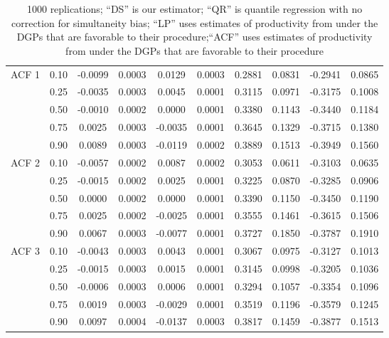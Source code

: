 \documentclass[11pt]{article}
\begin{document}
\begin{table}[H]
\begin{tabular}{cccccccccc}
   \hline
ACF 1 & 0.10 & -0.0099 & 0.0003 & 0.0129 & 0.0003 & 0.2881 & 0.0831 & -0.2941 & 0.0865 \\ 
   & 0.25 & -0.0035 & 0.0003 & 0.0045 & 0.0001 & 0.3115 & 0.0971 & -0.3175 & 0.1008 \\ 
   & 0.50 & -0.0010 & 0.0002 & 0.0000 & 0.0001 & 0.3380 & 0.1143 & -0.3440 & 0.1184 \\ 
   & 0.75 & 0.0025 & 0.0003 & -0.0035 & 0.0001 & 0.3645 & 0.1329 & -0.3715 & 0.1380 \\ 
   & 0.90 & 0.0089 & 0.0003 & -0.0119 & 0.0002 & 0.3889 & 0.1513 & -0.3949 & 0.1560 \\ 
  ACF 2 & 0.10 & -0.0057 & 0.0002 & 0.0087 & 0.0002 & 0.3053 & 0.0611 & -0.3103 & 0.0635 \\ 
   & 0.25 & -0.0015 & 0.0002 & 0.0025 & 0.0001 & 0.3225 & 0.0870 & -0.3285 & 0.0906 \\ 
   & 0.50 & 0.0000 & 0.0002 & 0.0000 & 0.0001 & 0.3390 & 0.1150 & -0.3450 & 0.1190 \\ 
   & 0.75 & 0.0025 & 0.0002 & -0.0025 & 0.0001 & 0.3555 & 0.1461 & -0.3615 & 0.1506 \\ 
   & 0.90 & 0.0067 & 0.0003 & -0.0077 & 0.0001 & 0.3727 & 0.1850 & -0.3787 & 0.1910 \\ 
  ACF 3 & 0.10 & -0.0043 & 0.0003 & 0.0043 & 0.0001 & 0.3067 & 0.0975 & -0.3127 & 0.1013 \\ 
   & 0.25 & -0.0015 & 0.0003 & 0.0015 & 0.0001 & 0.3145 & 0.0998 & -0.3205 & 0.1036 \\ 
   & 0.50 & -0.0006 & 0.0003 & 0.0006 & 0.0001 & 0.3294 & 0.1057 & -0.3354 & 0.1096 \\ 
   & 0.75 & 0.0019 & 0.0003 & -0.0029 & 0.0001 & 0.3519 & 0.1196 & -0.3579 & 0.1245 \\ 
   & 0.90 & 0.0097 & 0.0004 & -0.0137 & 0.0003 & 0.3817 & 0.1459 & -0.3877 & 0.1513 \\ 
   \hline
\end{tabular}
\caption*{1000 replications; ``DS'' is our estimator; ``QR'' is quantile regression with no correction for simultaneity bias; ``LP'' uses estimates of productivity from \cite{Levinsohn2003} under the DGPs that are favorable to their procedure;``ACF'' uses estimates of productivity from \cite{Ackerberg2015} under the DGPs that are favorable to their procedure}
\label{simresults}
\end{table}
\pagebreak
\newpage
\end{document}
